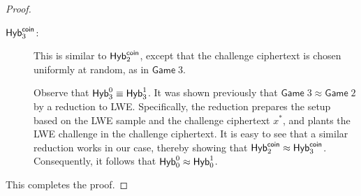 \begin{proof}
\begin{description}
\item[$\mathsf{Hyb}_{3}^{\mathsf{coin}}$:] This is similar to $\mathsf{Hyb}_2^{\mathsf{coin}}$, except
that the challenge ciphertext is chosen uniformly at random, as in
$\mathsf{Game}\;3$.

Observe that $\mathsf{Hyb}_3^0 \equiv \mathsf{Hyb}_3^1$. It was shown previously
that $\mathsf{Game}\;3 \approx \mathsf{Game}\;2$ by a reduction to
LWE. Specifically, the reduction prepares the setup based on the LWE
sample and the challenge ciphertext $x^*$, and plants the LWE
challenge in the challenge ciphertext. It is easy to see that a
similar reduction works in our case, thereby showing that
$\mathsf{Hyb}_2^{\mathsf{coin}} \approx \mathsf{Hyb}_3^{\mathsf{coin}}$. Consequently, it follows that
$\mathsf{Hyb}_0^0 \approx \mathsf{Hyb}_0^1$.
\end{description}
This completes the proof.
\end{proof}






